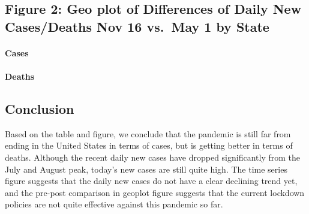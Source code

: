 \documentclass[
]{article}
\begin{document}
\hypertarget{figure-2-geo-plot-of-differences-of-daily-new-casesdeaths-nov-16-vs.-may-1-by-state}{%
\subsection{Figure 2: Geo plot of Differences of Daily New Cases/Deaths
Nov 16 vs.~May 1 by
State}\label{figure-2-geo-plot-of-differences-of-daily-new-casesdeaths-nov-16-vs.-may-1-by-state}}

\hypertarget{cases-1}{%
\paragraph{Cases}\label{cases-1}}

\hypertarget{htmlwidget-857da3f1d3769fb5d963}{}
\begin{plotly}

\end{plotly}

\hypertarget{deaths-1}{%
\paragraph{Deaths}\label{deaths-1}}

\hypertarget{htmlwidget-2a044e74b233fbb7bcbc}{}
\begin{plotly}

\end{plotly}

\hypertarget{conclusion}{%
\subsection{Conclusion}\label{conclusion}}

Based on the table and figure, we conclude that the pandemic is still
far from ending in the United States in terms of cases, but is getting
better in terms of deaths. Although the recent daily new cases have
dropped significantly from the July and August peak, today's new cases
are still quite high. The time series figure suggests that the daily new
cases do not have a clear declining trend yet, and the pre-post
comparison in geoplot figure suggests that the current lockdown policies
are not quite effective against this pandemic so far.
\end{document}
